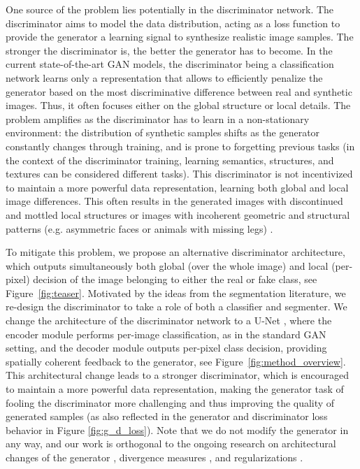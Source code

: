 \documentclass[10pt,twocolumn,letterpaper]{article}
\begin{document}
 
One source of the problem lies potentially in the discriminator network. The discriminator aims to model the data distribution, acting as a loss function to provide the generator a learning signal to synthesize realistic image samples. 
The stronger the discriminator is, the better the generator has to become.
In the current state-of-the-art GAN models, the discriminator being a classification network learns only a representation that allows to efficiently penalize the generator based on the most discriminative difference between real and synthetic images. Thus, it often focuses either on the global structure or local details. The problem amplifies as the discriminator has to learn in a non-stationary environment: the distribution of synthetic samples shifts as the generator constantly changes through training, and is prone to forgetting previous tasks \cite{ChenSS2019} (in the context of the discriminator training, learning semantics, structures, and textures can be considered different tasks). 
This discriminator is not incentivized to maintain a more powerful data representation, learning both global and local image differences. This often results in the generated images with discontinued and mottled local structures \cite{Lin2019COCOGANGB} or images with incoherent geometric and structural patterns (e.g. asymmetric faces or animals with missing legs) \cite{Zhang_SAGAN19}. 


To mitigate this problem, we propose an alternative discriminator architecture, which outputs simultaneously both global (over the whole image) and local (per-pixel) decision of the image belonging to either the real or fake class, see Figure~\ref{fig:teaser}. Motivated by the ideas from the segmentation literature, we re-design the discriminator to take a role of both a classifier and segmenter. We change the architecture of the discriminator network to a U-Net  \cite{Ronneberger2015UNetCN}, where the encoder module performs per-image classification, as in the standard GAN setting, and the decoder module outputs per-pixel class decision, providing spatially coherent feedback to the generator, see Figure~\ref{fig:method_overview}.
This architectural change leads to a stronger discriminator, which is encouraged to maintain a more powerful data representation, making the generator task of fooling the discriminator more challenging and thus improving the quality of generated samples (as also reflected in the generator and discriminator loss behavior in Figure \ref{fig:g_d_loss}). Note that we do not modify the generator in any way, and our work is orthogonal to the ongoing research on architectural changes of the generator \cite{Karras2018ASG, Lin2019COCOGANGB}, divergence measures \cite{Li2017MMDGT, Arjovsky2017WGAN, Nowozin2016fGANTG}, and regularizations \cite{Roth_NeurIPS2017,gulrajani_NeurIPS2017,miyato2018spectral}. 
\end{document}
